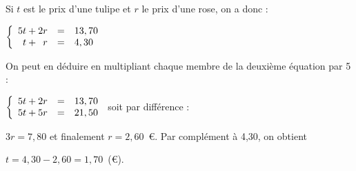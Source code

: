 
\medskip
 
% 
% 
%
% 
%
%

%
%
Si $t$ est le prix d’une tulipe et $r$ le prix d’une rose, on a donc :

$\left\{\begin{array}{l c l}
5t + 2r&=&13,70\\
\phantom{5}t + \phantom{5}r&=&4,30
\end{array}\right.$

On peut en déduire en multipliant chaque membre de la deuxième équation par 5 :

$\left\{\begin{array}{l c l}
5t + 2r&=&13,70\\
5t + 5r&=&21,50
\end{array}\right.$ soit par différence :

$3r = 7,80$ et finalement $r = 2,60$~\euro. Par complément à 4,30, on obtient 

$t = 4,30 - 2,60 = 1,70$~(\euro).
\vspace{0,5cm}

